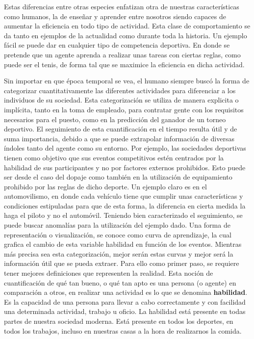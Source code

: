 \documentclass[11pt,twoside,spanish]{report} %
\begin{document}
Estas diferencias entre otras especies enfatizan otra de nuestras caracter\'isticas como humanos, la de ense\~nar y aprender entre nosotros siendo capaces de aumentar la eficiencia en todo tipo de actividad.
Esta clase de comportamiento se da tanto en ejemplos de la actualidad como durante toda la historia. Un ejemplo f\'acil se puede dar en cualquier tipo de competencia deportiva.
En donde se pretende que un agente aprenda a realizar unas tareas con ciertas reglas, como puede ser el tenis, de forma tal que se maximice la eficiencia en dicha actividad.



Sin importar en que \'epoca temporal se vea, el humano siempre busc\'o la forma de categorizar cuantitativamente las diferentes actividades para diferenciar a los individuos de su sociedad.
Esta categorizaci\'on se utiliza de manera explicita o impl\'icita, tanto en la toma de empleado, para contratar gente con los requisitos necesarios para el puesto, como en la predicci\'on del ganador de un torneo deportivo.
El seguimiento de esta cuantificaci\'on en el tiempo resulta \'util  y de suma importancia, debido a que se puede extrapolar informaci\'on de diversas \'indoles tanto del agente como su entorno.
Por ejemplo, las sociedades deportivas tienen como objetivo que sus eventos competitivos est\'en centrados por la habilidad de sus participantes y no por factores externos prohibidos.
Esto puede ser desde el caso del dopaje como tambi\'en en la utilizaci\'on de equipamiento prohibido por las reglas de dicho deporte.
Un ejemplo claro es en el automovilismo, en donde cada veh\'iculo tiene que cumplir unas caracter\'isticas y condiciones estipuladas para que de esta forma, la diferencia en cierta medida la haga el piloto y no el autom\'ovil.
Teniendo bien caracterizado el seguimiento, se puede buscar anomal\'ias para la utilizaci\'on del ejemplo dado.
Una forma de representaci\'on o visualizaci\'on, se conoce como curva de aprendizaje, la cual grafica el cambio de esta variable habilidad en funci\'on de los eventos.
Mientras m\'as precisa sea esta categorizaci\'on, mejor ser\'an estas curvas y mejor ser\'a la informaci\'on \'util que se pueda extraer.
Para ello como primer paso, se requiere tener mejores definiciones que representen la realidad.
Esta noci\'on de cuantificaci\'on de qu\'e tan bueno, o qu\'e tan apto es una persona (o agente) en comparaci\'on a otros, en realizar una actividad es lo que se denomina \textbf{habilidad}.
Es la capacidad de una persona para llevar a cabo correctamente y con facilidad una determinada actividad, trabajo u oficio.
La habilidad est\'a presente en todas partes de nuestra sociedad moderna.
Est\'a presente en todos los deportes, en todos los trabajos, incluso en nuestras casas a la hora de realizarnos la comida.
\end{document}
